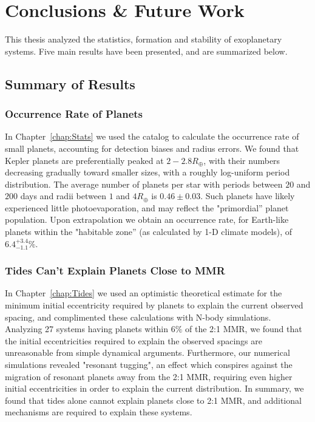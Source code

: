 \chapter{Conclusions \& Future Work}
\label{chap:conc}
This thesis analyzed the statistics, formation and stability of exoplanetary systems. 
Five main results have been presented, and are summarized below. 

\section{Summary of Results}
\subsection{Occurrence Rate of \kep Planets}
In Chapter~\ref{chap:Stats} we used the \citet{Ramirez2014} \kep catalog to calculate the occurrence rate of small planets, accounting for detection biases and radius errors. 
We found that Kepler planets are preferentially peaked at $2-2.8R_\oplus$, with their numbers decreasing gradually toward smaller sizes, with a roughly log-uniform period distribution.
The average number of planets per star with periods between $20$ and $200$ days and radii between $1$ and $4R_\oplus$ is $0.46 \pm 0.03$. 
Such planets have likely experienced little photoevaporation, and may reflect the "primordial'' planet population. 
Upon extrapolation we obtain an occurrence rate, for Earth-like planets within the "habitable zone'' (as calculated by 1-D climate models), of $6.4^{+3.4}_{-1.1}\%$. 

\subsection{Tides Can't Explain Planets Close to MMR}
In Chapter~\ref{chap:Tides} we used an optimistic theoretical estimate for the minimum initial eccentricity required by \kep planets to explain the current observed spacing, and complimented these calculations with N-body simulations.
Analyzing 27 \kep systems having planets within $6\%$ of the 2:1 MMR, we found that the initial eccentricities required to explain the observed spacings are unreasonable from simple dynamical arguments.
Furthermore, our numerical simulations revealed "resonant tugging", an effect which conspires against the migration of resonant planets away from the 2:1 MMR, requiring even higher initial eccentricities in order to explain the current \kep distribution. 
In summary, we found that tides alone cannot explain planets close to 2:1 MMR, and additional mechanisms are required to explain these systems. 

